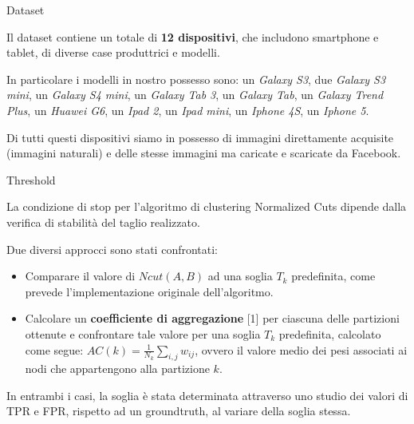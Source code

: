 
\begin{tframe}{Dataset}

Il dataset contiene un totale di \textbf{12 dispositivi}, che includono smartphone e tablet, di diverse case produttrici e modelli.

\vspace{0.3cm}

In particolare i modelli in nostro possesso sono: un \emph{Galaxy S3}, due \emph{Galaxy S3 mini}, un \emph{Galaxy S4 mini}, un \emph{Galaxy Tab 3}, un \emph{Galaxy Tab}, un \emph{Galaxy Trend Plus}, un \emph{Huawei G6}, un \emph{Ipad 2}, un \emph{Ipad mini}, un \emph{Iphone 4S}, un \emph{Iphone 5}. 

\vspace{0.3cm}

Di tutti questi dispositivi siamo in possesso di immagini direttamente acquisite (immagini naturali) e delle stesse immagini ma caricate e scaricate da Facebook.


\end{tframe}


\begin{tframe}{Threshold}

La condizione di stop per l'algoritmo di clustering Normalized Cuts dipende dalla verifica di stabilità del taglio realizzato.

\vspace{0.1in}

Due diversi approcci sono stati confrontati:
\begin{itemize}
\item Comparare il valore di $Ncut(A, B)$ ad una soglia $T_{k}$ predefinita, come prevede l'implementazione originale dell'algoritmo.
\item Calcolare un \textbf{coefficiente di aggregazione} [1] per ciascuna delle partizioni ottenute e confrontare tale valore per una soglia $T_{k}$ predefinita, calcolato come segue: $AC(k) = \frac{1}{N_{k}} \sum_{i, j} w_{ij}$, ovvero il valore medio dei pesi associati ai nodi che appartengono alla partizione $k$.
\end{itemize}

\vspace{0.1in}

In entrambi i casi, la soglia è stata determinata attraverso uno studio dei valori di TPR e FPR, rispetto ad un groundtruth, al variare della soglia stessa.

\end{tframe}

